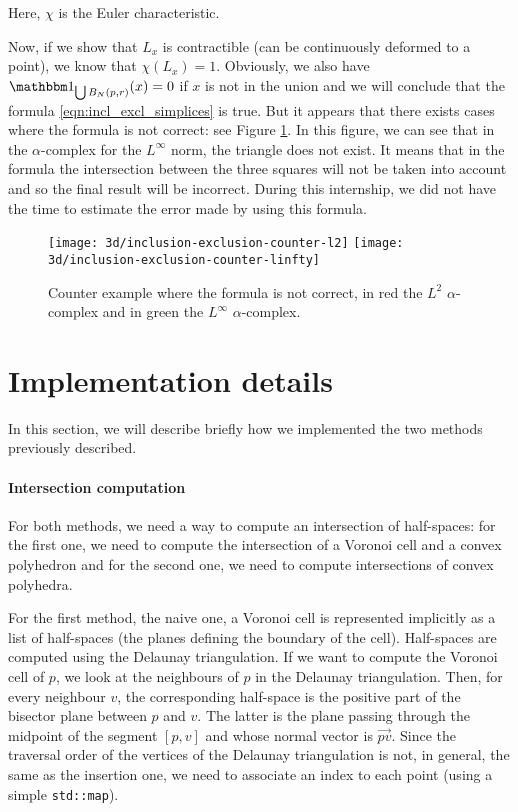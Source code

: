 Here, $ \chi $ is the Euler characteristic.

Now, if we show that $ L_x $ is contractible (can be continuously deformed to a
point), we know that $ \chi(L_x) = 1 $. Obviously, we also have $
\indicator{\bigcup B_N(p, r)}(x) = 0 $ if $ x $ is not in the union and we will
conclude that the formula \ref{eqn:incl_excl_simplices} is true. But it appears
that there exists cases where the formula is not correct: see Figure
\ref{fig:incl_excl-examples}. In this figure, we can see that in the
$\alpha$-complex for the $ L^\infty $ norm, the triangle does not exist. It
means that in the formula the intersection between the three squares will not be
taken into account and so the final result will be incorrect. During this
internship, we did not have the time to estimate the error made by using this
formula.

\begin{figure}[h]
    \centering
    \texttt{[image: 3d/inclusion-exclusion-counter-l2]}
    \hspace{2cm}
    \texttt{[image: 3d/inclusion-exclusion-counter-linfty]}
    \caption{Counter example where the formula is not correct, in red the
        $ L^2$ $\alpha$-complex and in green the $ L^\infty$ $\alpha$-complex.}
    \label{fig:incl_excl-examples}
\end{figure}

\section{Implementation details}
\label{sec:3d-implementation}

In this section, we will describe briefly how we implemented the two methods
previously described.

\paragraph{Intersection computation}

For both methods, we need a way to compute an intersection of half-spaces: for
the first one, we need to compute the intersection of a Voronoi cell and a
convex polyhedron and for the second one, we need to compute intersections of
convex polyhedra.

For the first method, the naive one, a Voronoi cell is represented implicitly as
a list of half-spaces (the planes defining the boundary of the cell).
Half-spaces are computed using the Delaunay triangulation. If we want to compute
the Voronoi cell of $ p $, we look at the neighbours of $ p $ in the Delaunay
triangulation. Then, for every neighbour $ v $, the corresponding half-space is
the positive part of the bisector plane between $ p $ and $ v $. The latter is
the  plane passing through the midpoint of the segment $ [p, v] $ and whose
normal vector is $ \vec{pv} $. Since the traversal order of the vertices of the
Delaunay triangulation is not, in general, the same as the insertion one, we
need to associate an index to each point (using a simple \texttt{std::map}).


